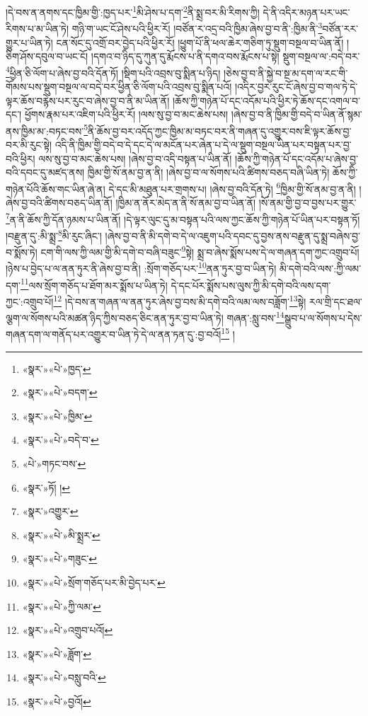 །དེ་བས་ན་ནགས་དང་ཁྱིམ་གྱི་:ཁྱད་པར་\footnote{«སྣར་»«པེ་»ཁྱད་}མི་ཤེས་པ་དག་\footnote{«སྣར་»«པེ་»བདག་}ནི་སྨྲ་བར་མི་རིགས་ཀྱི། དེ་ནི་འདིར་མཉན་པར་ཡང་རིགས་པ་མ་ཡིན་ཏེ། གཉི་ག་ཡང་ངོ་ཤེས་པའི་ཕྱིར་རོ། །བཙོན་ར་འདྲ་བའི་ཁྱིམ་ཞེས་བྱ་བ་ནི་:ཁྱིམ་ནི་\footnote{«སྣར་»«པེ་»ཁྱིམ་}བཙོན་རར་གྱུར་པ་ཡིན་ཏེ། ངན་སོང་དུ་འགྲོ་བར་བྱེད་པའི་ཕྱིར་རོ། །ཕྱུག་པོ་ནི་ཕལ་ཆེར་གཅིག་ཏུ་སྡུག་བསྔལ་བ་ཡིན་ནོ། །ཅིག་ཤོས་དབུལ་བ་ཡང་ངོ། །དགའ་བ་ཉིད་དུ་ཀུན་དུ་རྨོངས་པ་ནི་དགའ་བས་རྨོངས་པ་སྟེ། སྡུག་བསྔལ་ལ་:བདེ་བར་\footnote{«སྣར་»«པེ་»བདེ་བ་}ཕྱིན་ཅི་ལོག་པ་ཞེས་བྱ་བའི་དོན་ཏོ། །སྡིག་པའི་འབྲས་བུ་སྨིན་པ་ཉིད། །ཅེས་བྱ་བ་ནི་སྐྱེ་བ་སྔ་མ་དག་ལ་རང་གི་གོམས་པས་སྡུག་བསྔལ་ལ་བདེ་བར་ཕྱིན་ཅི་ལོག་པའི་འབྲས་བུ་སྨིན་པའོ། །འདིར་བྱར་རུང་ངོ་ཞེས་བྱ་བ་གལ་ཏེ་དེ་ལྟར་ཆོས་བརྙེས་པར་རུང་བ་ཞེས་བྱ་བ་ནི་མ་ཡིན་ནོ། །ཆོས་ཀྱི་གཉེན་པོ་དང་འདོམ་པའི་ཕྱིར་ཏེ་ཆོས་དང་འགལ་བ་དང་། ཕྱོགས་རྣམ་པར་འཇིག་པའི་ཕྱིར་རོ། །ལས་སུ་བྱ་བ་མང་ཆེས་པས། །ཞེས་བྱ་བ་ནི་ཁྱིམ་གྱི་བདེ་བ་ཡིན་ནོ་སྙམ་ནས་ཁྱིམ་མ་:བཏང་བས་\footnote{«པེ་»གཏང་བས་}ནི་ཆོས་བྱ་བར་འདོད་ཀྱང་ཁྱིམ་མ་བཏང་བར་ནི་གཞན་དུ་འགྱུར་བས་ཇི་ལྟར་ཆོས་བྱ་བར་མི་རུང་སྟེ། འདི་ནི་ཁྱིམ་གྱི་བདེ་བ་དེ་དང་དེ་ལ་མངོན་པར་ཞེན་པ་དེ་ལ་སྡུག་བསྔལ་ཡིན་པར་བསྟན་པར་བྱ་བའི་ཕྱིར། ལས་སུ་བྱ་བ་མང་ཆེས་པས། །ཞེས་བྱ་བ་འདི་བསྟན་པ་ཡིན་ནོ། །ཆོས་ཀྱི་གཉེན་པོ་དང་འདོམ་པ་ཞེས་བྱ་བའི་དབང་དུ་མཛད་ནས། ཁྱིམ་གྱི་སོ་ནམ་བྱ་ན་ནི། །ཞེས་བྱ་བ་ལ་སོགས་པའི་ཚིགས་བཅད་བཞི་ཡིན་ཏེ། ཆོས་ཀྱི་གཉེན་པོའི་ཆོས་གང་ཡིན་ཞེ་ན། དེ་དང་མི་མཐུན་པར་གྲགས་པ། །ཞེས་བྱ་བའི་དོན་ཏེ། \footnote{«སྣར་»ཏོ། ། }ཁྱིམ་གྱི་སོ་ནམ་བྱ་ན་ནི། །ཞེས་བྱ་བའི་ཚིགས་བཅད་ཡིན་ནོ། །ཁྱིམ་ན་ནོར་མེད་ན་ནི་སོ་ནམ་བྱ་བ་ཡིན་ནོ། །སོ་ནམ་གྱི་བྱ་བ་བྱས་པར་གྱུར་\footnote{«སྣར་»འགྱུར་}ན་ནི་ཆོས་ཀྱི་དོན་ཉམས་པ་ཡིན་ནོ། །དེ་ལྟར་ལུང་དུ་མ་བསྟན་པའི་ལས་ཀྱང་ཆོས་ཀྱི་གཉེན་པོ་ཡིན་པར་བསྟན་ཏོ། །བརྫུན་དུ་:མི་སྨྲ་\footnote{«སྣར་»«པེ་»མི་སྨྲར་}མི་རུང་ཞིང་། །ཞེས་བྱ་བ་ནི་མི་དགེ་བ་དེ་ལ་འཇུག་པའི་དབང་དུ་བྱས་ནས་བརྫུན་དུ་སྨྲ་བཞེས་བྱ་བ་སྨོས་ཏེ། ངག་གི་ལས་ཀྱི་ལམ་གྱི་མི་དགེ་བ་བཞི་བཟུང་\footnote{«སྣར་»«པེ་»གཟུང་}སྟེ། སྨྲ་བ་ཞེས་སྨོས་པས་དེ་ལ་གཞན་དག་ཀྱང་འགྲུབ་པོ། །ཉེས་པ་བྱེད་པ་ལ་ནན་ཏུར་ནི་ཞེས་བྱ་བ་ནི། :སྲོག་གཅོད་པར་\footnote{«སྣར་»«པེ་»སྲོག་གཅོད་པར་མི་བྱེད་པར་}ནན་ཏུར་བྱ་བ་ཡིན་ཏེ། མི་དགེ་བའི་ལས་:ཀྱི་ལམ་དག་\footnote{«སྣར་»«པེ་»ཀྱི་ལམ་}ལས་སྲོག་གཅོད་པ་ཐོག་མར་སྨོས་པ་ཡིན་ཏེ། དེ་དང་པོར་སྨོས་པས་ལུས་ཀྱི་མི་དགེ་བའི་ལས་དག་ཀྱང་:འགྲུབ་པོ།\footnote{«སྣར་»«པེ་»འགྲུབ་པའོ།} །དེ་བས་ན་གཞན་ལ་ནན་ཏུར་ཞེས་བྱ་བས་མི་དགེ་བའི་ལམ་ལས་བཟློག་\footnote{«སྣར་»«པེ་»ཟློག་}སྟེ། རལ་གྲི་དང་ཐལ་ལྕག་ལ་སོགས་པའི་མཚན་ཉིད་ཀྱིས་བཅད་ཅིང་ནན་ཏུར་བྱ་བ་ཡིན་ཏེ། གཞན་:སླུ་བས་\footnote{«སྣར་»«པེ་»བསླུ་བའི་}སྒྲུབ་པ་ལ་སོགས་པ་དེས་གཞན་དག་ལ་གནོད་པར་འགྱུར་བ་ཡིན་ཏེ་དེ་ལ་ནན་ཏན་དུ་:བྱ་བའོ།\footnote{«སྣར་»«པེ་»བྱའོ།} །
